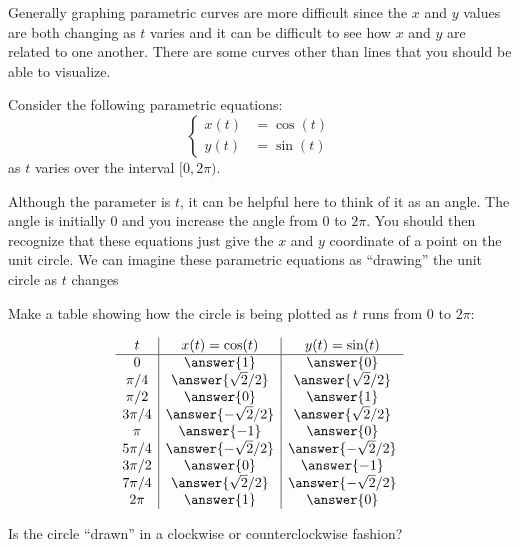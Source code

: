 \documentclass{ximera}
\begin{document}
Generally graphing parametric curves are more difficult since the $x$ and $y$ values are both changing as $t$ varies and it can be difficult to see how $x$ and $y$ are related to one another.  There are some curves other than lines that you should be able to visualize.

\begin{example}
Consider the following parametric equations:
\[
\begin{cases}
x(t)&=\cos(t) \\
y(t)&=\sin(t)
\end{cases}
\]
as $t$ varies over the interval $[0, 2\pi)$.


Although the parameter is $t$, it can be helpful here to think of it as an angle. The angle is initially $0$ and you increase the angle from $0$ to $2\pi$. You should then recognize that these equations just give the $x$ and $y$ coordinate of a point on the unit circle. We can imagine these parametric equations as  ``drawing'' the unit circle as $t$ changes

\begin{question}
 Make a table showing how the circle is being plotted as $t$ runs from $0$ to $2\pi$:
  \begin{prompt}
    \[
    \begin{array}{c|c|c}
      t      & x(t) = \cos(t) & y(t) = \sin(t)\\ \hline
      0      & \answer{1}              & \answer{0}\\
      \pi/4  & \answer{\sqrt{2}/2}     & \answer{\sqrt{2}/2}\\
      \pi/2  & \answer{0}              & \answer{1}\\
      3\pi/4 & \answer{-\sqrt{2}/2}    & \answer{\sqrt{2}/2}\\
      \pi    & \answer{-1}             & \answer{0}\\
      5\pi/4 & \answer{-\sqrt{2}/2}    & \answer{-\sqrt{2}/2}\\
      3\pi/2 & \answer{0}              & \answer{-1}\\
      7\pi/4 & \answer{\sqrt{2}/2}     & \answer{-\sqrt{2}/2}\\
      2\pi   & \answer{1}              & \answer{0}
    \end{array}
    \]
  \end{prompt}
\end{question}

  \begin{question}
    Is the circle ``drawn'' in a clockwise or counterclockwise fashion?
    \begin{prompt}
      \begin{multipleChoice}
      \end{multipleChoice}
    \end{prompt}
\end{question}





\end{example}
\end{document}
